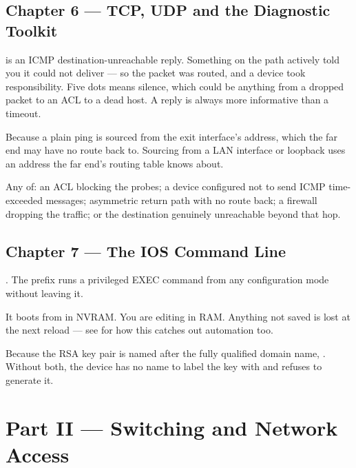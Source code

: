 \subsection*{Chapter 6 --- TCP, UDP and the Diagnostic Toolkit}
\begin{tightnum}
  \item {} is an ICMP destination-unreachable reply. Something on the path
        actively told you it could not deliver --- so the packet was routed, and a
        device took responsibility. Five dots means silence, which could be
        anything from a dropped packet to an ACL to a dead host. A reply is
        always more informative than a timeout.
  \item Because a plain ping is sourced from the exit interface's address, which
        the far end may have no route back to. Sourcing from a LAN interface or
        loopback uses an address the far end's routing table knows about.
  \item Any of: an ACL blocking the probes; a device configured not to send ICMP
        time-exceeded messages; asymmetric return path with no route back; a
        firewall dropping the traffic; or the destination genuinely unreachable
        beyond that hop.
\end{tightnum}

\subsection*{Chapter 7 --- The IOS Command Line}
\begin{tightnum}
  \item {}. The  prefix runs a privileged EXEC command
        from any configuration mode without leaving it.
  \item It boots from  in NVRAM. You are editing
         in RAM. Anything not saved is lost at the next
        reload --- see  for how this catches out automation too.
  \item Because the RSA key pair is named after the fully qualified domain name,
        . Without both, the device has no name to label the
        key with and refuses to generate it.
\end{tightnum}

\section*{Part II --- Switching and Network Access}

